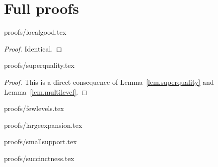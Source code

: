 \section{Full proofs}

\restateLemLocalGood
{proofs/localgood.tex}

\restateLemMultilevel
\begin{proof}
Identical.
\Qed
\end{proof}

\restateLemSuperquality
{proofs/superquality.tex}

\restateLemSuperchain
\begin{proof}
This is a direct consequence of Lemma~\ref{lem.superquality} and
Lemma~\ref{lem.multilevel}. \Qed
\end{proof}

\restateThmFewLevels
{proofs/fewlevels.tex}

\restateThmLargeExpansion
{proofs/largeexpansion.tex}

\restateThmSmallSupport
{proofs/smallsupport.tex}

\restateThmSuccinctness
{proofs/succinctness.tex}
